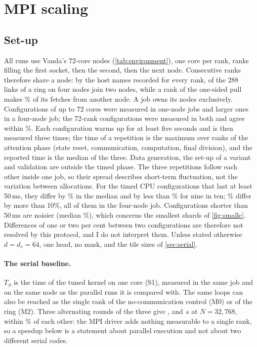 \section{MPI scaling}\label{sec:mpi}

\subsection{Set-up}\label{sec:setup}
All runs use Vanda's 72-core nodes (\cref{tab:environment}), one core per rank,
ranks filling the first socket, then the second, then the next node. Consecutive
ranks therefore share a node: by the host names recorded for every rank,
 of the 288 links of a ring on four nodes join two nodes,
while a rank of the one-sided pull makes \% of its
fetches from another node. A job owns its
nodes exclusively. Configurations of up to 72 cores were measured in one-node jobs
and larger ones in a four-node job; the 72-rank configurations were measured in
both and agree within \%. Each configuration warms up
for at least five seconds and is then measured three times; the time of a repetition
is the maximum over ranks of the attention phase (state reset, communication,
computation, final division), and the reported time is the median of the three.
Data generation, the set-up of a variant and validation are outside the timed
phase. The
three repetitions follow each other inside one job, so their spread describes
short-term fluctuation, not the variation between allocations. For the
 timed CPU configurations that last at least 50\,ms, they differ by
\% in the median and by less than \% for
nine in ten; \% differ by more than 10\%, all of them in the
four-node job. Configurations shorter than 50\,ms are noisier (median
\%), which concerns the smallest shards of
\cref{fig:smallc}. Differences of one or two per cent between two configurations
are therefore not resolved by this protocol, and I do not interpret them.
Unless stated otherwise $d=d_v=64$, one head, no mask, and the tile sizes of
\cref{sec:serial}.

\paragraph{The serial baseline.} $T_S$ is the time of the tuned kernel on one core
(S1), measured in the same job and on the same node as the parallel runs it is
compared with. The same loops can also be reached as the single rank of the
no-communication control (M0) or of the ring (M2). Three alternating rounds of the
three give ,  and \,s at
$N=32{,}768$, within \% of each other: the MPI driver adds
nothing measurable to a single rank, so a speedup below is a statement about
parallel execution and not about two different serial codes.

